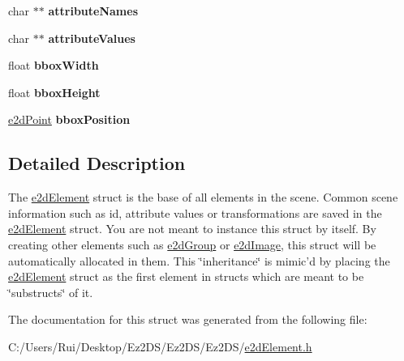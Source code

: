 \begin{DoxyCompactItemize}
\item 
\hypertarget{structe2d_element_af9b5d9dbbf270b6f92a3ee66ce1b47ac}{char $\ast$$\ast$ {\bfseries attribute\-Names}}\label{structe2d_element_af9b5d9dbbf270b6f92a3ee66ce1b47ac}

\item 
\hypertarget{structe2d_element_ae8591ff93c366b4d66817a70f2d9f33e}{char $\ast$$\ast$ {\bfseries attribute\-Values}}\label{structe2d_element_ae8591ff93c366b4d66817a70f2d9f33e}

\item 
\hypertarget{structe2d_element_a6a1d9b223870deeaec7f5e8b23ca4b22}{float {\bfseries bbox\-Width}}\label{structe2d_element_a6a1d9b223870deeaec7f5e8b23ca4b22}

\item 
\hypertarget{structe2d_element_a680d0d4219ac8720005c46b55a9676ae}{float {\bfseries bbox\-Height}}\label{structe2d_element_a680d0d4219ac8720005c46b55a9676ae}

\item 
\hypertarget{structe2d_element_ac2c17ce4cba805b594b314a77923cbf5}{\hyperlink{structe2d_point}{e2d\-Point} {\bfseries bbox\-Position}}\label{structe2d_element_ac2c17ce4cba805b594b314a77923cbf5}

\end{DoxyCompactItemize}


\subsection{Detailed Description}
The \hyperlink{structe2d_element}{e2d\-Element} struct is the base of all elements in the scene. Common scene information such as id, attribute values or transformations are saved in the \hyperlink{structe2d_element}{e2d\-Element} struct. You are not meant to instance this struct by itself. By creating other elements such as \hyperlink{structe2d_group}{e2d\-Group} or \hyperlink{structe2d_image}{e2d\-Image}, this struct will be automatically allocated in them. This \char`\"{}inheritance\char`\"{} is mimic'd by placing the \hyperlink{structe2d_element}{e2d\-Element} struct as the first element in structs which are meant to be \char`\"{}substructs\char`\"{} of it. 

The documentation for this struct was generated from the following file\-:\begin{DoxyCompactItemize}
\item 
C\-:/\-Users/\-Rui/\-Desktop/\-Ez2\-D\-S/\-Ez2\-D\-S/\-Ez2\-D\-S/\hyperlink{e2d_element_8h}{e2d\-Element.\-h}\end{DoxyCompactItemize}
